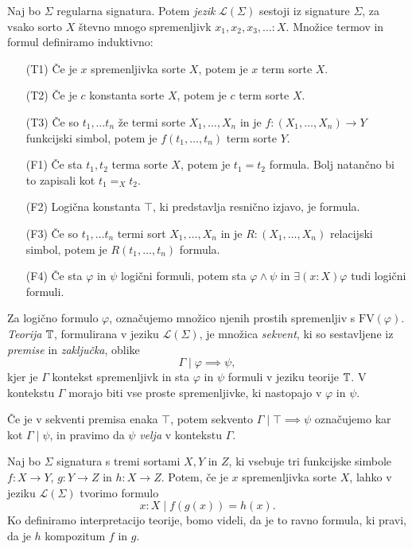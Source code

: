 \documentclass[../kategoricna_logika.tex]{subfiles}
\begin{document}
\begin{definicija}
  Naj bo $\Sigma$ regularna signatura.  Potem \emph{jezik}
  $\mathcal{L}(\Sigma)$ sestoji iz signature $\Sigma$, za vsako
  sorto $X$ števno mnogo spremenljivk $x_1,x_2,x_3,\ldots : X$.
  Množice termov in formul definiramo induktivno:
  \begin{itemize}
  \item [(T1)] Če je $x$ spremenljivka sorte $X$, potem je $x$ term
    sorte $X$.
  \item [(T2)] Če je $c$ konstanta sorte $X$, potem je $c$ term sorte
    $X$.
  \item [(T3)] Če so $t_1, \ldots t_n$ že termi sorte
    $X_1, \ldots, X_n$ in je $f : (X_1, \ldots, X_n) \to Y$
    funkcijski simbol, potem je $f(t_1, \ldots, t_n)$ term sorte $Y$.
  \item [(F1)] Če sta $t_1, t_2$ terma sorte $X$, potem je $t_1 = t_2$
    formula. Bolj natančno bi to zapisali kot $t_1 =_X t_2$.
  \item [(F2)] Logična konstanta $\top$, ki predstavlja resnično
    izjavo, je formula.
  \item [(F3)] Če so $t_1, \ldots t_n$ termi sort $X_1, \ldots, X_n$
    in je $R : (X_1, \ldots, X_n)$ relacijski
    simbol, potem je $R(t_1, \ldots, t_n)$ formula.
  \item [(F4)] Če sta $\varphi$ in $\psi$ logični formuli, potem sta
    $\varphi \wedge \psi$ in $\exists (x:X) \varphi$ tudi logični formuli.
  \end{itemize}
  Za logično formulo $\varphi$, označujemo množico njenih prostih
  spremenljiv s $\mathrm{FV}(\varphi)$.  \emph{Teorija} $\mathbb{T}$,
  formulirana v jeziku $\mathcal{L}(\Sigma)$, je množica
  \emph{sekvent}, ki so sestavljene iz \emph{premise} in
  \emph{zaključka}, oblike
  \[ \Gamma \mid \varphi \implies \psi,\]
  kjer je $\Gamma$ kontekst spremenljivk in sta
  $\varphi$ in $\psi$ formuli v jeziku teorije $\mathbb{T}$.
  V kontekstu $\Gamma$ morajo biti vse proste spremenljivke,
  ki nastopajo v $\varphi$ in $\psi$.
\end{definicija}
Če je v sekventi premisa enaka $\top$, potem sekvento
$\Gamma \mid \top \implies \psi$ označujemo kar kot $\Gamma \mid \psi$, in pravimo da $\psi$
\emph{velja} v kontekstu $\Gamma$.
\begin{primer}\label{primer:kompozitum}
  Naj bo $\Sigma$ signatura s tremi sortami $X,Y$ in $Z$, ki
  vsebuje tri funkcijske simbole $f: X \to Y$, $g : Y \to Z$ in
  $h : X \to Z$.  Potem, če je $x$ spremenljivka sorte $X$, lahko v
  jeziku $\mathcal{L}(\Sigma)$ tvorimo formulo
  $$x:X \mid f(g(x)) = h(x).$$
  Ko definiramo interpretacijo teorije, bomo videli, da je to
  ravno formula, ki pravi, da je $h$ kompozitum $f$ in $g$.
\end{primer}
\end{document}
